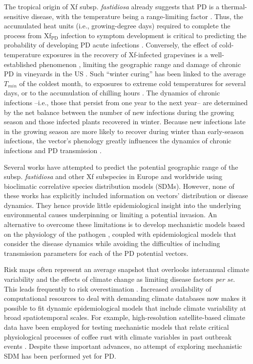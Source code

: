 The tropical origin of Xf subsp. \textit{fastidiosa} already suggests that PD
is a thermal-sensitive disease, with the temperature being a range-limiting
factor \cite{Castillo2021, Purcell2013}. Thus, the accumulated heat units
(i.e., growing-degree days) required to complete the process from
Xf$_{\textrm{PD}}$ infection to symptom development is critical to predicting
the probability of developing PD acute infections \cite{Feil2001}. Conversely,
the effect of cold-temperature exposures in the recovery of Xf-infected
grapevines is a well-established phenomenon \cite{Feil2001, Lieth2011,
    Purcell1980}, limiting the geographic range and damage of chronic PD in
vineyards in the US \cite{Hopkins2002}. Such ``winter curing'' has been linked
to the average $T_{min}$ of the coldest month, to exposures to extreme cold
temperatures for several days, or to the accumulation of chilling hours
\cite{Anas2008}. The dynamics of chronic infections --i.e., those that persist
from one year to the next year-- are determined by the net balance between the
number of new infections during the growing season and those infected plants
recovered in winter. Because new infections late in the growing season are more
likely to recover during winter than early-season infections, the vector's
phenology greatly influences the dynamics of chronic infections and PD
transmission  \cite{Feil2003,Redak2004,Gruber2012,Daugherty2019}.

Several works have attempted to predict the potential geographic range of the
subsp. \textit{fastidiosa} \cite{Bragard2019, Godefroid2019,Hoddle2004} and
other Xf subspecies in Europe \cite{Bosso2016, Schneider2020} and worldwide
\cite{Hoddle2004} using bioclimatic correlative species distribution models
(SDMs). However, none of these works has explicitly included information on
vectors' distribution or disease dynamics. They hence provide little
epidemiological insight into the underlying environmental causes underpinning
or limiting a potential invasion. An alternative to overcome these limitations
is to develop mechanistic models based on the physiology of the pathogen
\cite{Kearney2009}, coupled with epidemiological models that consider the
disease dynamics while avoiding the difficulties of including transmission
parameters for each of the PD potential vectors.

Risk maps often represent an average snapshot that overlooks interannual
climate variability and the effects of climate change as limiting disease
factors \textit{per se}. This leads frequently to risk overestimation
\cite{Bebber2013,Coakley1999,Scherm1994,Truscott2003}. Increased availability
of computational resources to deal with demanding climate databases now makes
it possible to fit dynamic epidemiological models that include climate
variability at broad spatiotemporal scales. For example, high-resolution
satellite-based climate data have been employed for testing mechanistic models
that relate critical physiological processes of coffee rust with climate
variables in past outbreak events \cite{Bebber2016}. Despite these important
advances, no attempt of exploring mechanistic SDM has been performed yet for
PD.

